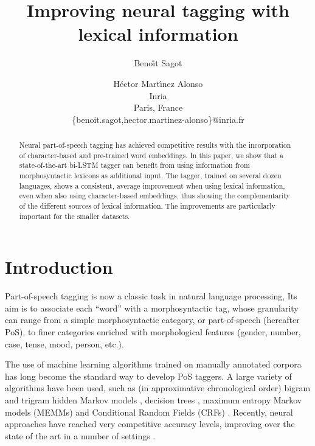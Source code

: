 \documentclass[11pt,a4paper]{article}
\title{Improving neural tagging with lexical information}
\author{Beno\^{\i}t Sagot \and H\'ector Mart\'{\i}nez Alonso \\
         Inria\\
       Paris, France\\
\{benoit.sagot,hector.martinez-alonso\}@inria.fr}
\date{}
\newcommand\hm[1]{\textcolor{blue}{#1}}
\newcommand\bs[1]{\textcolor{red}{#1}}
\newcommand\discussion[1]{}
\newcommand\final[1]{#1}
\begin{document}
\maketitle
\begin{abstract}
  Neural part-of-speech tagging has achieved competitive results with the incorporation of character-based and
  pre-trained word embeddings. In this paper, we show that a state-of-the-art bi-LSTM tagger can benefit from using
  information from morphosyntactic lexicons as additional input. The tagger, trained on several dozen languages, shows a
  consistent, \discussion{\hm{\textbf{HM what follows could be shortened:} average improvement of 2.6\% tagging accuracy
      for systems without character-based embeddings, and an improvement of 0.6\% in the presence of character-based
      embeddings, which indicates that morphosyntactic lexicons do indeed provide information that is not captured by
      the embeddings themselves, both character-based and word-level.}  \bs{\textbf{BS: I agree. I suggest:} average
      improvement when using lexical information, even when also using character-based embeddings, thus showing the
      complementarity of the different sources of lexical information.}}\final{average improvement when using lexical
    information, even when also using character-based embeddings, thus showing the complementarity of the different
    sources of lexical information.} The improvements are particularly important for the smaller datasets.
\end{abstract}


\section{Introduction}

Part-of-speech tagging is now a classic task in natural language processing, \discussion{\hm{\textbf{HM candidate for
      deleletion/compression:} for which many systems have been developed or adapted for a large variety of
    languages.}\bs{\textbf{BS: I suggest simple deletion}}} Its aim is to associate each ``word'' with a morphosyntactic
tag, whose granularity can range from a simple morphosyntactic category, or part-of-speech (hereafter PoS), to finer
categories enriched with morphological features (gender, number, case, tense, mood, person, etc.).

The use of machine learning algorithms trained on manually annotated corpora has long become the standard way to develop
PoS taggers. A large variety of algorithms have been used, such as (in approximative chronological order) bigram and
trigram hidden Markov models \cite{merialdo94,brants96,brants00}, decision trees \cite{schmid94,magerman95}, maximum
entropy Markov models (MEMMs) \cite{ratnaparkhi96} and Conditional Random Fields (CRFs)
\cite{lafferty01,constant12}. Recently, neural approaches have reached very competitive accuracy levels, improving over
the state of the art in a number of settings \cite{plank16}.
\end{document}
